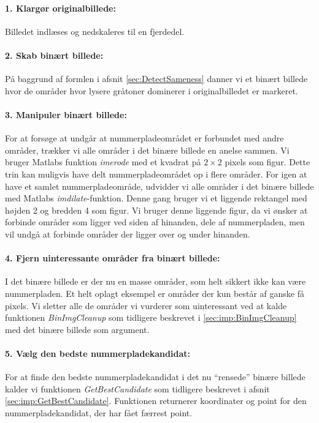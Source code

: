 \paragraph{1. Klargør originalbillede:}
Billedet indlæses og nedskaleres til en fjerdedel. 

\paragraph{2. Skab binært billede:}
På baggrund af formlen i afsnit \ref{sec:DetectSameness} danner vi et binært billede hvor de områder hvor lysere gråtoner dominerer i originalbilledet er markeret.

\paragraph{3. Manipuler binært billede:}
For at forsøge at undgår at nummerpladeområdet er forbundet med andre områder, trækker vi alle områder i det binære billede en anelse sammen. Vi bruger Matlabs funktion \textit{imerode} med et kvadrat på $2 \times 2$ pixels som figur. Dette trin kan muligvis have delt nummerpladeområdet op i flere områder. For igen at have et samlet nummerpladeområde, udvidder vi alle områder i det binære billede med Matlabs \textit{imdilate}-funktion. Denne gang bruger vi et liggende rektangel med højden 2 og bredden 4 som figur. Vi bruger denne liggende figur, da vi ønsker at forbinde områder som ligger ved siden af hinanden, dele af nummerpladen, men vil undgå at forbinde områder der ligger over og under hinanden. 


\paragraph{4. Fjern uinteressante områder fra binært billede:}
I det binære billede er der nu en masse områder, som helt sikkert ikke kan være nummerpladen. Et helt oplagt eksempel er områder der kun består af ganske få pixels. Vi sletter alle de områder vi vurderer som uinteressant ved at kalde funktionen \textit{BinImgCleanup} som tidligere beskrevet i \vref{sec:imp:BinImgCleanup} med det binære billede som argument.

\paragraph{5. Vælg den bedste nummerpladekandidat:}
For at finde den bedste nummerpladekandidat i det nu ``rensede'' binære billede kalder vi funktionen \textit{GetBestCandidate} som tidligere beskrevet i afsnit \vref{sec:imp:GetBestCandidate}. Funktionen returnerer koordinater og point for den nummerpladekandidat, der har fået færrest point. 


